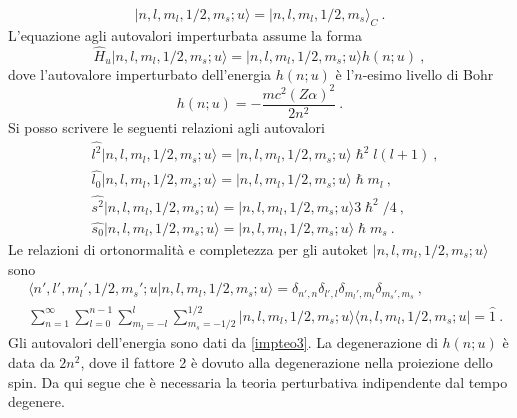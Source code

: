 \documentclass[12pt,a4paper]{report}
\numberwithin{equation}{section}
\numberwithin{section}{chapter}
\begin{document}
	\begin{equation}
	\label{impteo1}
	|n,l,m_l,1/2,m_s;u\rangle=|n,l,m_l,1/2,m_s\rangle_C~.
	\end{equation}
	L'equazione agli autovalori imperturbata assume la forma
	\begin{equation}
	\label{impteo2}
	\widehat{H}_u|n,l,m_l,1/2,m_s;u\rangle=|n,l,m_l,1/2,m_s;u\rangle h(n;u)~,
	\end{equation}
	dove l'autovalore imperturbato dell'energia $h(n;u)$ \`e l'$n$-esimo livello di Bohr
	\begin{equation}
	\label{impteo3}
	h(n;u) = -\frac{mc^2(Z\alpha)^2}{2n^2}~.
	\end{equation}
	Si posso scrivere le seguenti relazioni agli autovalori
	\begin{subequations}
		\begin{align}
		&\widehat{l^2}|n,l,m_l,1/2,m_s;u\rangle = |n,l,m_l,1/2,m_s;u\rangle\hslash^2l(l+1)~,\label{impteo4:first}\\
		&\widehat{l_0}|n,l,m_l,1/2,m_s;u\rangle = |n,l,m_l,1/2,m_s;u\rangle\hslash m_l~,\label{impteo4:second}\\
		&\widehat{s^2}|n,l,m_l,1/2,m_s;u\rangle = |n,l,m_l,1/2,m_s;u\rangle 3\hslash^2/4~,\label{impteo4:third}\\
		&\widehat{s_0}|n,l,m_l,1/2,m_s;u\rangle = |n,l,m_l,1/2,m_s;u\rangle\hslash m_s~.\label{impteo4:fourth}
		\end{align}
	\end{subequations}
	Le relazioni di ortonormalit\`a e completezza per gli autoket $|n,l,m_l,1/2,m_s;u\rangle$ sono
	\begin{subequations}
		\begin{align}
		&\langle n',l',{m_l}',1/2,{m_s}';u|n,l,m_l,1/2,m_s;u\rangle = \delta_{n',n}\delta_{l',l}\delta_{{m_l}',m_l}\delta_{{m_s}',m_s}~,\label{impteo5:first}\\
		&\sum\nolimits_{n=1}^{\infty}\sum\nolimits_{l=0}^{n-1}\sum\nolimits_{m_l=-l}^{l}\sum\nolimits_{m_s=-1/2}^{1/2} |n,l,m_l,1/2,m_s;u\rangle\langle n,l,m_l,1/2,m_s;u| = \widehat{1}~.\label{impteo5:second}
		\end{align}
	\end{subequations}
	Gli autovalori dell'energia sono dati da \eqref{impteo3}. La degenerazione di $h(n;u)$ \`e data da $2n^2$, dove il fattore 2 \`e dovuto alla degenerazione nella proiezione dello spin. Da qui segue che \`e necessaria la teoria perturbativa indipendente dal tempo degenere.
	
\end{document}
